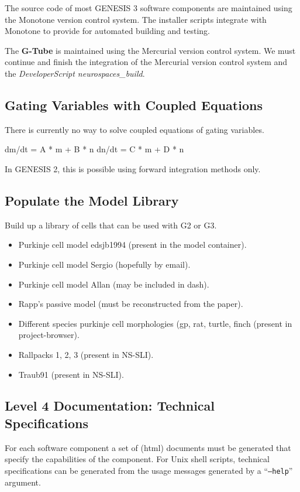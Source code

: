 \documentclass[12pt]{article}
\begin{document}
The source code of most GENESIS 3 software components are maintained
using the Monotone version control system.  The installer scripts
integrate with Monotone to provide for automated building and testing.

The {\bf G-Tube} is maintained using the Mercurial version control system.
We must continue and finish the integration of the Mercurial version
control system and the {\it DeveloperScript neurospaces\_build}.


\subsection{Gating Variables with Coupled Equations}

There is currently no way to solve coupled equations of gating
variables.

dm/dt = A * m + B * n
dn/dt = C * m + D * n

In GENESIS 2, this is possible using forward integration methods only.


\subsection{Populate the Model Library}

Build up a library of cells that can be used with G2 or G3.

\begin{itemize}
\item Purkinje cell model edsjb1994 (present in the model container).
\item Purkinje cell model Sergio (hopefully by email).
\item Purkinje cell model Allan (may be included in dash).
\item Rapp's passive model (must be reconstructed from the paper).
\item Different species purkinje cell morphologies (gp, rat, turtle,
  finch (present in project-browser).
\item Rallpacks 1, 2, 3 (present in NS-SLI).
\item Traub91 (present in NS-SLI).
\end{itemize}

\subsection{Level 4 Documentation: Technical Specifications}

For each software component a set of (html) documents must be
generated that specify the capabilities of the component.  For Unix
shell scripts, technical specifications can be generated from the
usage messages generated by a ``{\tt --help}'' argument.
\end{document}
